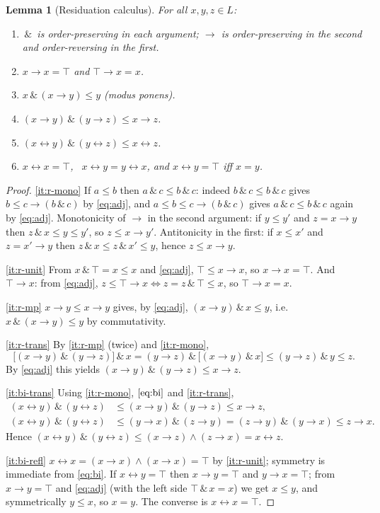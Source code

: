 \documentclass{amsart}
\theoremstyle{definition}
\theoremstyle{plain}
\newtheorem{lemma}{Lemma}
\newcommand{\fto}{\rightarrow}
\newcommand{\fbi}{\leftrightarrow}
\newcommand{\odotop}{\,\&\,}
\newcommand{\Top}{\top}
\begin{document}
\begin{lemma}[Residuation calculus]\label{lem:res}
For all $x,y,z\in L$:
\begin{enumerate}
\item\label{it:r-mono} $\odotop$ is order-preserving in each argument;
$\fto$ is order-preserving in the second and order-reversing in the first.
\item\label{it:r-unit} $x\fto x=\Top$ and $\Top\fto x=x$.
\item\label{it:r-mp} $x\odotop(x\fto y)\le y$ (modus ponens).
\item\label{it:r-trans} $(x\fto y)\odotop(y\fto z)\le x\fto z$.
\item\label{it:bi-trans} $(x\fbi y)\odotop(y\fbi z)\le x\fbi z$.
\item\label{it:bi-refl} $x\fbi x=\Top$, \ $x\fbi y=y\fbi x$, and $x\fbi y=\Top$
iff $x=y$.
\end{enumerate}
\end{lemma}

\begin{proof}
\eqref{it:r-mono} If $a\le b$ then $a\odotop c\le b\odotop c$: indeed
$b\odotop c\le b\odotop c$ gives $b\le c\fto(b\odotop c)$ by \eqref{eq:adj}, and
$a\le b\le c\fto(b\odotop c)$ gives $a\odotop c\le b\odotop c$ again by
\eqref{eq:adj}.  Monotonicity of $\fto$ in the second argument: if $y\le y'$ and
$z=x\fto y$ then $z\odotop x\le y\le y'$, so $z\le x\fto y'$.  Antitonicity in the
first: if $x\le x'$ and $z=x'\fto y$ then $z\odotop x\le z\odotop x'\le y$, hence
$z\le x\fto y$.

\eqref{it:r-unit} From $x\odotop\Top=x\le x$ and \eqref{eq:adj}, $\Top\le x\fto x$,
so $x\fto x=\Top$.  And $\Top\fto x$: from \eqref{eq:adj},
$z\le\Top\fto x \iff z=z\odotop\Top\le x$, so $\Top\fto x=x$.

\eqref{it:r-mp} $x\fto y\le x\fto y$ gives, by \eqref{eq:adj},
$(x\fto y)\odotop x\le y$, i.e.\ $x\odotop(x\fto y)\le y$ by commutativity.

\eqref{it:r-trans} By \eqref{it:r-mp} (twice) and \eqref{it:r-mono},
\[
\bigl[(x\fto y)\odotop(y\fto z)\bigr]\odotop x
=(y\fto z)\odotop\bigl[(x\fto y)\odotop x\bigr]
\le (y\fto z)\odotop y \le z .
\]
By \eqref{eq:adj} this yields $(x\fto y)\odotop(y\fto z)\le x\fto z$.

\eqref{it:bi-trans} Using \eqref{it:r-mono}, $\eqref{eq:bi}$ and \eqref{it:r-trans},
\begin{align*}
(x\fbi y)\odotop(y\fbi z)
&\le (x\fto y)\odotop(y\fto z)\le x\fto z,\\
(x\fbi y)\odotop(y\fbi z)
&\le (y\fto x)\odotop(z\fto y)=(z\fto y)\odotop(y\fto x)\le z\fto x.
\end{align*}
Hence $(x\fbi y)\odotop(y\fbi z)\le (x\fto z)\wedge(z\fto x)=x\fbi z$.

\eqref{it:bi-refl} $x\fbi x=(x\fto x)\wedge(x\fto x)=\Top$ by \eqref{it:r-unit};
symmetry is immediate from \eqref{eq:bi}.  If $x\fbi y=\Top$ then
$x\fto y=\Top$ and $y\fto x=\Top$; from $x\fto y=\Top$ and \eqref{eq:adj}
(with the left side $\Top\odotop x=x$) we get $x\le y$, and symmetrically
$y\le x$, so $x=y$.  The converse is $x\fbi x=\Top$.
\end{proof}
\end{document}
